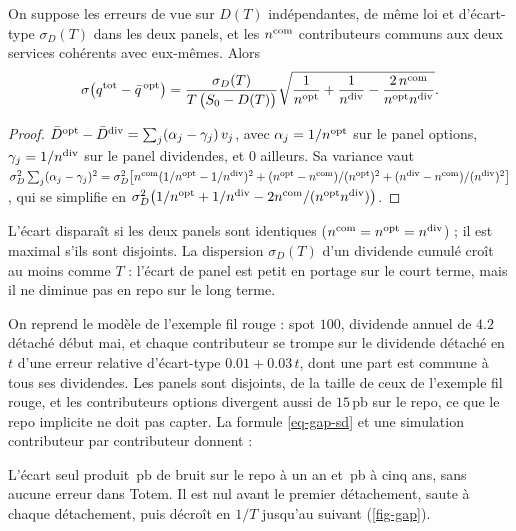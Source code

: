 \begin{corollary}\label{cor-gap}
On suppose les erreurs de vue sur $D(T)$ indépendantes, de même loi et d'écart-type $\sigma_D(T)$ dans les deux
panels, et les $n^{\mathrm{com}}$ contributeurs communs aux deux services cohérents avec eux-mêmes. Alors
\begin{equation}\label{eq-gap-sd}
\sigma\bigl(q^{\mathrm{tot}}-\bar q^{\,\mathrm{opt}}\bigr)=\frac{\sigma_D(T)}{T\,\bigl(S_0-D(T)\bigr)}
\sqrt{\frac{1}{n^{\mathrm{opt}}}+\frac{1}{n^{\mathrm{div}}}-\frac{2\,n^{\mathrm{com}}}{n^{\mathrm{opt}}n^{\mathrm{div}}}} .
\end{equation}
\end{corollary}
\begin{proof}
$\bar D^{\mathrm{opt}}-\bar D^{\mathrm{div}}=\sum_j(\alpha_j-\gamma_j)\,v_j$, avec $\alpha_j=1/n^{\mathrm{opt}}$ sur le panel options, $\gamma_j=1/n^{\mathrm{div}}$ sur
le panel dividendes, et $0$ ailleurs. Sa variance vaut
$\sigma_D^2\sum_j(\alpha_j-\gamma_j)^2=\sigma_D^2\bigl[n^{\mathrm{com}}(1/n^{\mathrm{opt}}-1/n^{\mathrm{div}})^2+(n^{\mathrm{opt}}-n^{\mathrm{com}})/(n^{\mathrm{opt}})^2
+(n^{\mathrm{div}}-n^{\mathrm{com}})/(n^{\mathrm{div}})^2\bigr]$, qui se simplifie en
$\sigma_D^2\bigl(1/n^{\mathrm{opt}}+1/n^{\mathrm{div}}-2n^{\mathrm{com}}/(n^{\mathrm{opt}}n^{\mathrm{div}})\bigr)$.
\end{proof}

L'écart disparaît si les deux panels sont identiques ($n^{\mathrm{com}}=n^{\mathrm{opt}}=n^{\mathrm{div}}$) ; il est maximal s'ils sont
disjoints. La dispersion $\sigma_D(T)$ d'un dividende cumulé croît au moins comme $T$ : l'écart de panel est petit en
portage sur le court terme, mais il ne diminue pas en repo sur le long terme.

\begin{example}\label{ex-gap}
On reprend le modèle de l'exemple fil rouge : spot $100$, dividende annuel de $\num{4.2}$ détaché début mai, et chaque
contributeur se trompe sur le dividende détaché en $t$ d'une erreur relative d'écart-type $\num{0.01}+\num{0.03}\,t$,
dont une part est commune à tous ses dividendes. Les panels sont disjoints, de la taille de ceux de l'exemple fil
rouge, et les contributeurs options divergent aussi de $15$\,pb sur le repo, ce que le repo implicite ne doit pas
capter. La formule \eqref{eq-gap-sd} et une simulation contributeur par contributeur donnent :
\begin{center}\end{center}
L'écart seul produit \vGapOneY\,pb de bruit sur le repo à un an et \vGapFiveY\,pb à cinq ans, sans aucune erreur dans
Totem. Il est nul avant le premier détachement, saute à chaque détachement, puis décroît en $1/T$ jusqu'au suivant
(\cref{fig-gap}).
\end{example}

